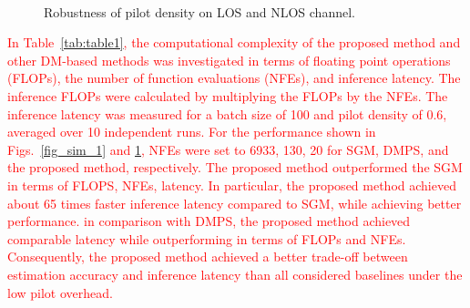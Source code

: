 \documentclass[lettersize,journal]{IEEEtran}
\begin{document}
\begin{figure}[!t]
\\
\caption{Robustness of pilot density on LOS and NLOS channel.}
\label{fig_sim_2}
\end{figure}

\textcolor{red}{
In Table~\ref{tab:table1}, the computational complexity of the proposed method and other DM-based methods was investigated in terms of floating point operations (FLOPs), the number of function evaluations (NFEs), and inference latency. The inference FLOPs were calculated by multiplying the FLOPs by the NFEs. The inference latency was measured for a batch size of 100 and pilot density of 0.6, averaged over 10 independent runs. For the performance shown in Figs.~\ref{fig_sim_1} and \ref{fig_sim_2}, NFEs were set to 6933, 130, 20 for SGM, DMPS, and the proposed method, respectively. The proposed method outperformed the SGM in terms of FLOPS, NFEs, latency. In particular, the proposed method achieved about 65 times faster inference latency compared to SGM, while achieving better performance. in comparison with DMPS, the proposed method achieved comparable latency while outperforming in terms of FLOPs and NFEs. Consequently, the proposed method achieved a better trade-off between estimation accuracy and inference latency than all considered baselines under the low pilot overhead.
}
\end{document}
